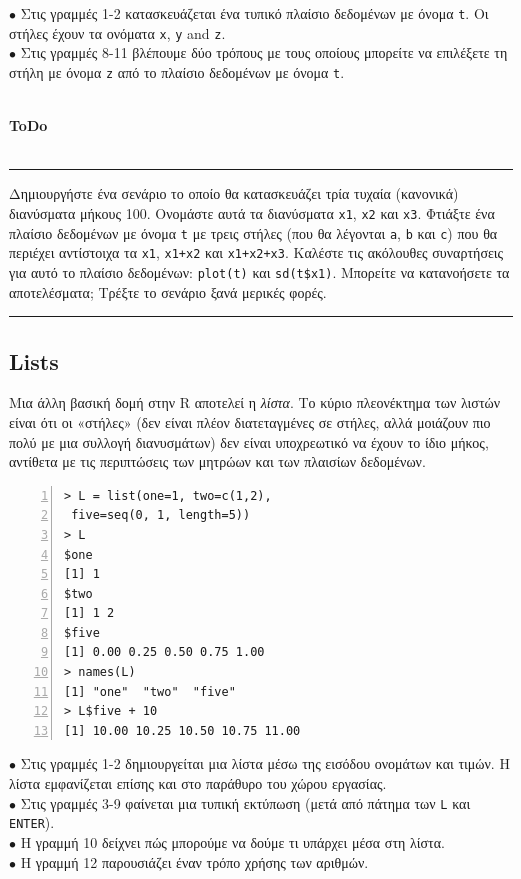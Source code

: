 \documentclass[a4paper,11pt,twocolumn,tablecaptionabove]{scrartcl}
\newenvironment{ToDo} {%
  \begin{flushright}
    \hfill
    \begin{minipage}{0.95\columnwidth}         %
    \textsf{\textbf{ToDo}} \\
      \vspace{-0.85cm}\\
      {\color{Gray}\rule[-0.1cm]{\columnwidth}{1.5pt}}} { %
      {\color{Gray} \rule[0.3cm]{\columnwidth}{1.5pt}}
    \end{minipage}
    \vspace{1em}
  \end{flushright}
  }
\begin{document}
\noindent $\bullet$ Στις γραμμές 1-2 κατασκευάζεται ένα τυπικό πλαίσιο δεδομένων με όνομα \texttt{t}. Οι στήλες
έχουν τα ονόματα \texttt{x}, \texttt{y} and \texttt{z}.\\
\noindent $\bullet$ Στις γραμμές 8-11 βλέπουμε δύο τρόπους με τους οποίους μπορείτε να επιλέξετε τη στήλη με 
όνομα \texttt{z} από το πλαίσιο δεδομένων με όνομα \texttt{t}.\\
\\

\begin{ToDo}
Δημιουργήστε ένα σενάριο το οποίο θα κατασκευάζει τρία τυχαία (κανονικά) διανύσματα μήκους 100. Ονομάστε
αυτά τα διανύσματα \texttt{x1}, \texttt{x2} και \texttt{x3}. Φτιάξτε ένα πλαίσιο δεδομένων με όνομα \texttt{t}
με τρεις στήλες (που θα λέγονται \texttt{a}, \texttt{b} και \texttt{c}) που θα περιέχει αντίστοιχα τα 
\texttt{x1}, \texttt{x1+x2} και \texttt{x1+x2+x3}. Καλέστε τις ακόλουθες συναρτήσεις για αυτό το πλαίσιο
δεδομένων: \texttt{plot(t)} και \texttt{sd(t\$x1)}. Μπορείτε να κατανοήσετε τα αποτελέσματα; Τρέξτε το
σενάριο ξανά μερικές φορές.\\
\end{ToDo}

\subsection{Lists}

Μια άλλη βασική δομή στην R αποτελεί η \emph{λίστα}. Το κύριο πλεονέκτημα των λιστών είναι ότι οι «στήλες»
(δεν είναι πλέον διατεταγμένες σε στήλες, αλλά μοιάζουν πιο πολύ με μια συλλογή διανυσμάτων) δεν είναι
υποχρεωτικό να έχουν το ίδιο μήκος, αντίθετα με τις περιπτώσεις των μητρώων και των πλαισίων δεδομένων.

\begin{Verbatim}[frame=single,numbers=left,gobble=0, xleftmargin=0.35cm, numbersep=0.1cm]
> L = list(one=1, two=c(1,2), 
 five=seq(0, 1, length=5))
> L
$one
[1] 1
$two
[1] 1 2
$five
[1] 0.00 0.25 0.50 0.75 1.00
> names(L)
[1] "one"  "two"  "five"
> L$five + 10
[1] 10.00 10.25 10.50 10.75 11.00
\end{Verbatim}

\noindent $\bullet$ Στις γραμμές 1-2 δημιουργείται μια λίστα μέσω της εισόδου ονομάτων και τιμών. Η λίστα
εμφανίζεται επίσης και στο παράθυρο του χώρου εργασίας.\\
\noindent $\bullet$ Στις γραμμές 3-9 φαίνεται μια τυπική εκτύπωση (μετά από πάτημα των \texttt{L} και
\texttt{ENTER}). \\
\noindent $\bullet$ Η γραμμή 10 δείχνει πώς μπορούμε να δούμε τι υπάρχει μέσα στη λίστα.\\
\noindent $\bullet$ Η γραμμή 12 παρουσιάζει έναν τρόπο χρήσης των αριθμών. \\
\end{document}
